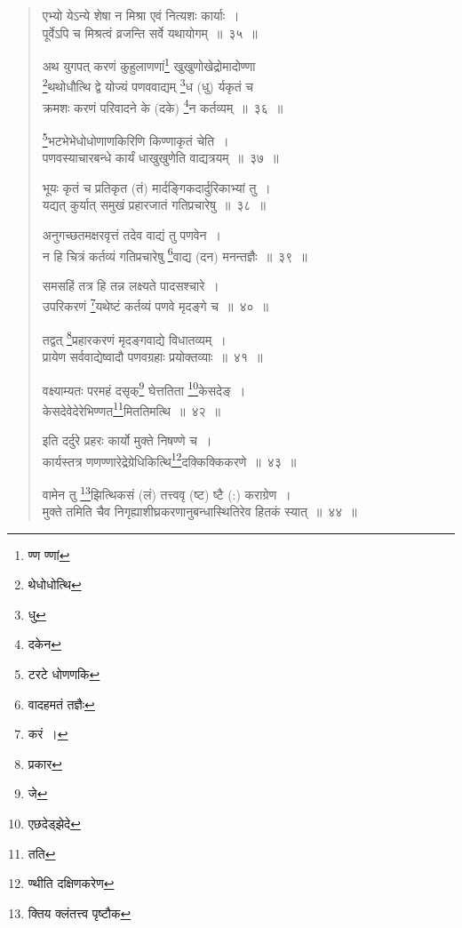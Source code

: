 \documentclass[11pt, openany]{book}
\begin{document}
\newpage

\begin{quote}
{\na एभ्यो येऽन्ये शेषा न मिश्रा एवं नित्यशः कार्याः~।\\
पूर्वेऽपि च मिश्रत्वं व्रजन्ति सर्वे यथायोगम्~॥~३५~॥

अथ युगपत् करणं कुहुलाणणां\renewcommand{\thefootnote}{1}\footnote{ण्ण ण्णां} खुखुणोखेद्रोमादोण्णा\\
\renewcommand{\thefootnote}{2}\footnote{थेधोधोत्थि}थथोधौत्थि द्वे योज्यं पणववाद्यम् \renewcommand{\thefootnote}{3}\footnote{धु}ध (धु) र्यकृतं च\\
क्रमशः करणं परिवादने के (दके) \renewcommand{\thefootnote}{4}\footnote{दकेन}न कर्तव्यम्~॥~३६~॥

\renewcommand{\thefootnote}{5}\footnote{टरटे धोणणकि}भटभेभेधोधोणाणकिरिणि किण्णाकृतं चेति~।\\
पणवस्याचारबन्धे कार्यं धाखुखुणेति वाद्यत्रयम्~॥~३७~॥

भूयः कृतं च प्रतिकृत (तं) मार्दङ्गिकदार्दुरिकाभ्यां तु~।\\
यद्यत् कुर्यात् समुखं प्रहारजातं गतिप्रचारेषु~॥~३८~॥

अनुगच्छतमक्षरवृत्तं तदेव वाद्यं तु पणवेन~।\\
न हि चित्रं कर्तव्यं गतिप्रचारेषु \renewcommand{\thefootnote}{6}\footnote{वादहमतं तज्ञैः}वाद्य (दन) मनन्तज्ञैः~॥~३९~॥

समसहिं तत्र हि तन्न लक्ष्यते पादसश्चारे~।\\
उपरिकरणं \renewcommand{\thefootnote}{7}\footnote{करं~।}यथेष्टं कर्तव्यं पणवे मृदङ्गे च~॥~४०~॥

तद्वत् \renewcommand{\thefootnote}{8}\footnote{प्रकार}प्रहारकरणं मृदङ्गवाद्ये विधातव्यम्~।\\
प्रायेण सर्ववाद्येष्वादौ पणवग्रहाः प्रयोक्तव्याः~॥~४१~॥

वक्ष्याम्यतः परमहं दसृक्\renewcommand{\thefootnote}{9}\footnote{जे} घेत्ततिता \renewcommand{\thefootnote}{10}\footnote{एछदेड्झेदे}केसदेङ्~।\\
केसदेवेदेरेभिण्णत\renewcommand{\thefootnote}{11}\footnote{तति}मिततिमत्थि~॥~४२~॥

इति दर्दुरे प्रहरः कार्यो मुक्ते निषण्णे च~।\\
कार्यस्तत्र णणण्णारेद्रेग्रेधिकित्थि\renewcommand{\thefootnote}{12}\footnote{ण्थीति दक्षिणकरेण}दक्किक्किकरणे~॥~४३~॥

वामेन तु \renewcommand{\thefootnote}{13}\footnote{क्तिय क्लंतत्त्व पृष्टौक}झित्थिकसं (लं) तत्त्ववृ (ष्ट) ष्टै (:) कराग्रेण~।\\
मुक्ते तमिति चैव निगृह्याशीघ्रकरणानुबन्धास्थितिरेव हितकं स्यात्~॥~४४~॥}
\end{quote}
\end{document}
